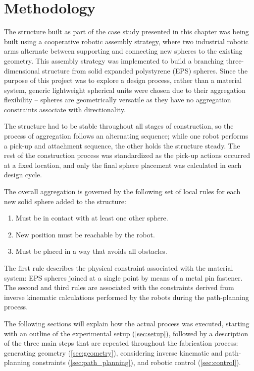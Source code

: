 \section{Methodology} \label{sec:methodology}
    The structure built as part of the case study presented in this chapter was being built using a cooperative robotic assembly strategy, where two industrial robotic arms alternate between supporting and connecting new spheres to the existing geometry. This assembly strategy was implemented to build a branching three-dimensional structure from solid expanded polystyrene (EPS) spheres. Since the purpose of this project was to explore a design process, rather than a material system, generic lightweight spherical units were chosen due to their aggregation flexibility -- spheres are geometrically versatile as they have no aggregation constraints associate with directionality.
    
    The structure had to be stable throughout all stages of construction, so the process of aggregation follows an alternating sequence; while one robot performs a pick-up and attachment sequence, the other holds the structure steady. The rest of the construction process was standardized as the pick-up actions occurred at a fixed location, and only the final sphere placement was calculated in each design cycle.
    
    The overall aggregation is governed by the following set of local rules for each new solid sphere added to the structure: 

    \begin{enumerate}
        \item Must be in contact with at least one other sphere.
        \item New position must be reachable by the robot.
        \item Must be placed in a way that avoids all obstacles.
    \end{enumerate}
    
    The first rule describes the physical constraint associated with the material system: EPS spheres joined at a single point by means of a metal pin fastener. The second and third rules are associated with the constraints derived from inverse kinematic calculations performed by the robots during the path-planning process.
    
    The following sections will explain how the actual process was executed, starting with an outline of the experimental setup (\cref{sec:setup}), followed by a description of the three main steps that are repeated throughout the fabrication process: generating geometry (\cref{sec:geometry}), considering inverse kinematic and path-planning constraints (\cref{sec:path_planning}), and robotic control (\cref{sec:control}).
    
